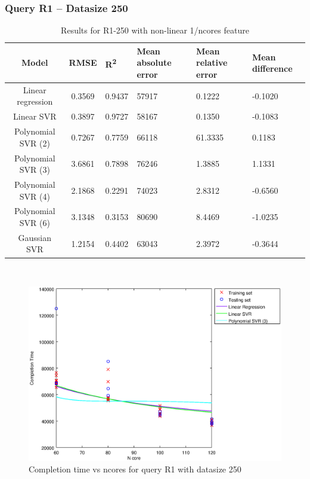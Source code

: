 \documentclass[a4paper,11pt]{article}
\begin{document}
\subsubsection{Query R1 -- Datasize 250}
\begin{table}[H]
	\centering
	\begin{adjustbox}{center}
		\begin{tabular}{c | c M{1.2cm} M{2.5cm} M{2.5cm} M{1.8cm}}
			Model & RMSE & R\textsuperscript{2} & Mean absolute error & Mean relative error & Mean difference \tabularnewline
			\hline
			Linear regression & 0.3569 & 0.9437 &  57917 & 0.1222 & -0.1020 \\
			Linear SVR & 0.3897 & 0.9727 &  58167 & 0.1350 & -0.1083 \\
			Polynomial SVR (2) & 0.7267 & 0.7759 &  66118 & 61.3335 & 0.1183 \\
			Polynomial SVR (3) & 3.6861 & 0.7898 &  76246 & 1.3885 & 1.1331 \\
			Polynomial SVR (4) & 2.1868 & 0.2291 &  74023 & 2.8312 & -0.6560 \\
			Polynomial SVR (6) & 3.1348 & 0.3153 &  80690 & 8.4469 & -1.0235 \\
			Gaussian SVR & 1.2154 & 0.4402 &  63043 & 2.3972 & -0.3644 \\
		\end{tabular}
	\end{adjustbox}
	\\
	\caption{Results for R1-250 with non-linear 1/ncores feature}
	\label{table_R1_prediction_all}
\end{table}

\begin {figure}[hbtp]
\centering
\includegraphics[width=\textwidth]{output/R1_250_NO_72_90_1_OVER_NCORES/plot_R1_250_bestmodels.eps}
\caption {Completion time vs ncores for query R1 with datasize 250}
\end {figure}
\end{document}
